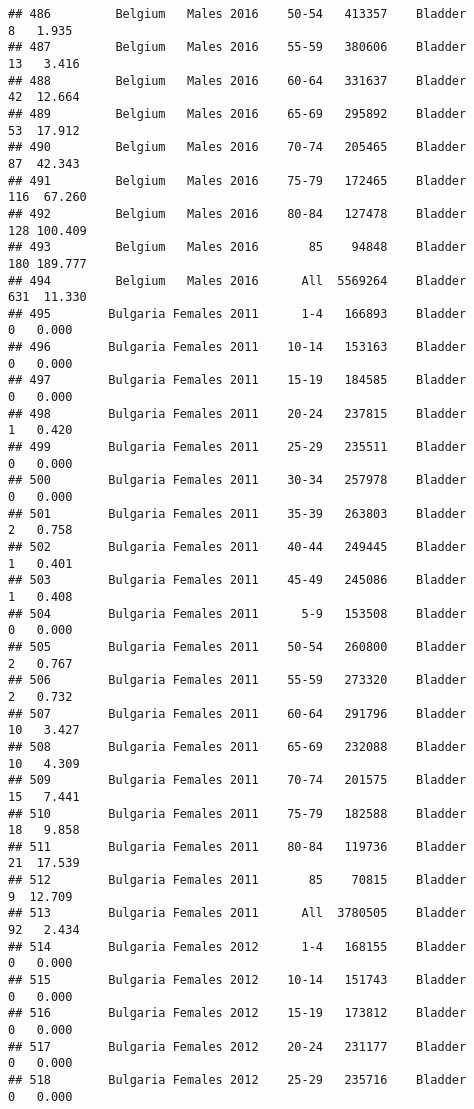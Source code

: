 \documentclass[
]{article}
\begin{document}
\begin{verbatim}
## 486         Belgium   Males 2016    50-54   413357    Bladder      8   1.935
## 487         Belgium   Males 2016    55-59   380606    Bladder     13   3.416
## 488         Belgium   Males 2016    60-64   331637    Bladder     42  12.664
## 489         Belgium   Males 2016    65-69   295892    Bladder     53  17.912
## 490         Belgium   Males 2016    70-74   205465    Bladder     87  42.343
## 491         Belgium   Males 2016    75-79   172465    Bladder    116  67.260
## 492         Belgium   Males 2016    80-84   127478    Bladder    128 100.409
## 493         Belgium   Males 2016       85    94848    Bladder    180 189.777
## 494         Belgium   Males 2016      All  5569264    Bladder    631  11.330
## 495        Bulgaria Females 2011      1-4   166893    Bladder      0   0.000
## 496        Bulgaria Females 2011    10-14   153163    Bladder      0   0.000
## 497        Bulgaria Females 2011    15-19   184585    Bladder      0   0.000
## 498        Bulgaria Females 2011    20-24   237815    Bladder      1   0.420
## 499        Bulgaria Females 2011    25-29   235511    Bladder      0   0.000
## 500        Bulgaria Females 2011    30-34   257978    Bladder      0   0.000
## 501        Bulgaria Females 2011    35-39   263803    Bladder      2   0.758
## 502        Bulgaria Females 2011    40-44   249445    Bladder      1   0.401
## 503        Bulgaria Females 2011    45-49   245086    Bladder      1   0.408
## 504        Bulgaria Females 2011      5-9   153508    Bladder      0   0.000
## 505        Bulgaria Females 2011    50-54   260800    Bladder      2   0.767
## 506        Bulgaria Females 2011    55-59   273320    Bladder      2   0.732
## 507        Bulgaria Females 2011    60-64   291796    Bladder     10   3.427
## 508        Bulgaria Females 2011    65-69   232088    Bladder     10   4.309
## 509        Bulgaria Females 2011    70-74   201575    Bladder     15   7.441
## 510        Bulgaria Females 2011    75-79   182588    Bladder     18   9.858
## 511        Bulgaria Females 2011    80-84   119736    Bladder     21  17.539
## 512        Bulgaria Females 2011       85    70815    Bladder      9  12.709
## 513        Bulgaria Females 2011      All  3780505    Bladder     92   2.434
## 514        Bulgaria Females 2012      1-4   168155    Bladder      0   0.000
## 515        Bulgaria Females 2012    10-14   151743    Bladder      0   0.000
## 516        Bulgaria Females 2012    15-19   173812    Bladder      0   0.000
## 517        Bulgaria Females 2012    20-24   231177    Bladder      0   0.000
## 518        Bulgaria Females 2012    25-29   235716    Bladder      0   0.000

\end{verbatim}
\end{document}
